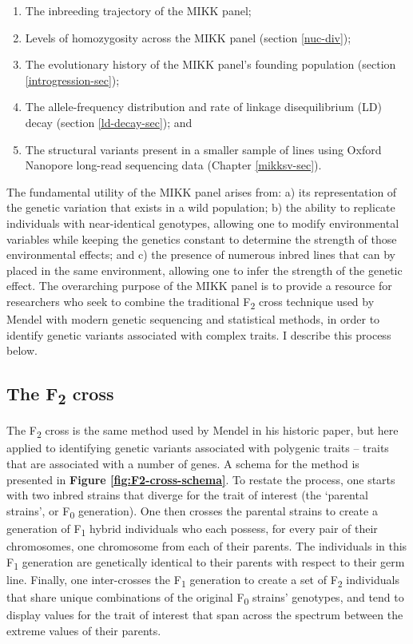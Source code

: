 \documentclass[
]{book}
\begin{document}
\begin{enumerate}
\def\labelenumi{\arabic{enumi}.}
\item
  The inbreeding trajectory of the MIKK panel;
\item
  Levels of homozygosity across the MIKK panel (section \ref{nuc-div});
\item
  The evolutionary history of the MIKK panel's founding population (section \ref{introgression-sec});
\item
  The allele-frequency distribution and rate of linkage disequilibrium (LD) decay (section \ref{ld-decay-sec}); and
\item
  The structural variants present in a smaller sample of lines using Oxford Nanopore long-read sequencing data (Chapter \ref{mikksv-sec}).
\end{enumerate}

The fundamental utility of the MIKK panel arises from: a) its representation of the genetic variation that exists in a wild population; b) the ability to replicate individuals with near-identical genotypes, allowing one to modify environmental variables while keeping the genetics constant to determine the strength of those environmental effects; and c) the presence of numerous inbred lines that can by placed in the same environment, allowing one to infer the strength of the genetic effect. The overarching purpose of the MIKK panel is to provide a resource for researchers who seek to combine the traditional F\textsubscript{2} cross technique used by Mendel with modern genetic sequencing and statistical methods, in order to identify genetic variants associated with complex traits. I describe this process below.

\hypertarget{the-f2-cross}{%
\subsection{\texorpdfstring{The F\textsubscript{2} cross}{The F2 cross}}\label{the-f2-cross}}

The F\textsubscript{2} cross is the same method used by Mendel in his historic paper, but here applied to identifying genetic variants associated with polygenic traits -- traits that are associated with a number of genes. A schema for the method is presented in \textbf{Figure \ref{fig:F2-cross-schema}}. To restate the process, one starts with two inbred strains that diverge for the trait of interest (the `parental strains', or F\textsubscript{0} generation). One then crosses the parental strains to create a generation of F\textsubscript{1} hybrid individuals who each possess, for every pair of their chromosomes, one chromosome from each of their parents. The individuals in this F\textsubscript{1} generation are genetically identical to their parents with respect to their germ line. Finally, one inter-crosses the F\textsubscript{1} generation to create a set of F\textsubscript{2} individuals that share unique combinations of the original F\textsubscript{0} strains' genotypes, and tend to display values for the trait of interest that span across the spectrum between the extreme values of their parents.
\end{document}
